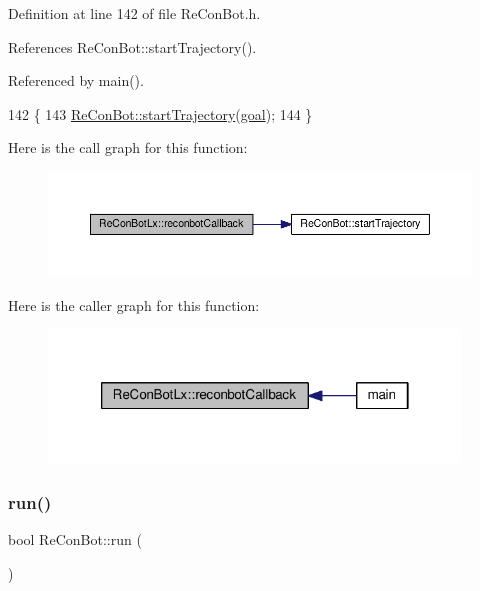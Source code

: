 Definition at line 142 of file Re\+Con\+Bot.\+h.



References Re\+Con\+Bot\+::start\+Trajectory().



Referenced by main().


\begin{DoxyCode}
142                                                                                  \{
143       \hyperlink{class_re_con_bot_ade3eb1a4752d45659321209f5730cef3}{ReConBot::startTrajectory}(\hyperlink{class_re_con_bot_a9bd1c7ddf2376e2e68ea5d8bd8c3f505}{goal});
144   \}
\end{DoxyCode}
Here is the call graph for this function\+:
\nopagebreak
\begin{figure}[H]
\begin{center}
\leavevmode
\includegraphics[width=350pt]{d2/d07/class_re_con_bot_lx_a5d60b16962e5ce8e452f7c53543c54ce_cgraph}
\end{center}
\end{figure}
Here is the caller graph for this function\+:
\nopagebreak
\begin{figure}[H]
\begin{center}
\leavevmode
\includegraphics[width=310pt]{d2/d07/class_re_con_bot_lx_a5d60b16962e5ce8e452f7c53543c54ce_icgraph}
\end{center}
\end{figure}
\mbox{\label{class_re_con_bot_ac264f3082203c3b2ef13b6f353476ca7}} 
\subsubsection{\texorpdfstring{run()}{run()}}
{\footnotesize\ttfamily bool Re\+Con\+Bot\+::run (\begin{DoxyParamCaption}{ }\end{DoxyParamCaption})\hspace{0.3cm}{\ttfamily [inherited]}}

